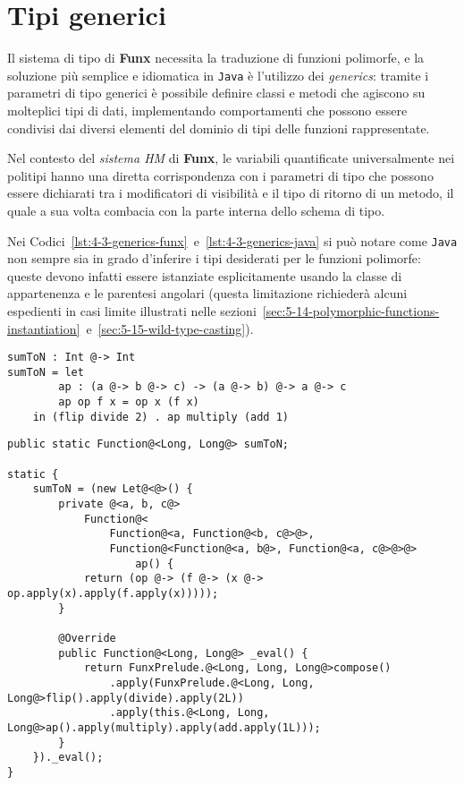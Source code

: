 \section{Tipi generici}
\label{sec:4-3-generics}

Il sistema di tipo di \textbf{Funx} necessita la traduzione di funzioni polimorfe,
e la soluzione più semplice e idiomatica in \texttt{Java} è l'utilizzo dei \textit{generics}:
tramite i parametri di tipo generici è possibile definire classi e metodi che agiscono su molteplici tipi di dati,
implementando comportamenti che possono essere condivisi dai diversi elementi del dominio di tipi delle funzioni rappresentate.


Nel contesto del \textit{sistema HM} di \textbf{Funx}, le variabili quantificate universalmente nei politipi
hanno una diretta corrispondenza con i parametri di tipo che possono essere dichiarati tra i modificatori di visibilità
e il tipo di ritorno di un metodo, il quale a sua volta combacia con la parte interna dello schema di tipo.


Nei Codici~\ref{lst:4-3-generics-funx}~e~\ref{lst:4-3-generics-java} si può notare come \texttt{Java} non sempre sia in grado
d'inferire i tipi desiderati per le funzioni polimorfe: queste devono infatti essere istanziate esplicitamente
usando la classe di appartenenza e le parentesi angolari (questa limitazione richiederà alcuni espedienti in casi limite
illustrati nelle sezioni~\ref{sec:5-14-polymorphic-functions-instantiation}~e~\ref{sec:5-15-wild-type-casting}).

\vspace{4mm}
\begin{lstlisting}[caption={Scrittura e utilizzo di funzioni polimorfe in \textbf{Funx}}, style=funxCode, label={lst:4-3-generics-funx}]
sumToN : Int @-> Int
sumToN = let
        ap : (a @-> b @-> c) -> (a @-> b) @-> a @-> c
        ap op f x = op x (f x)
    in (flip divide 2) . ap multiply (add 1)
\end{lstlisting}
\vspace{4mm}
\begin{lstlisting}[caption={Corrispondenti proprietà e metodi \texttt{Java}}, style=javaCode, label={lst:4-3-generics-java}]
public static Function@<Long, Long@> sumToN;

static {
    sumToN = (new Let@<@>() {
        private @<a, b, c@>
            Function@<
                Function@<a, Function@<b, c@>@>,
                Function@<Function@<a, b@>, Function@<a, c@>@>@>
                    ap() {
            return (op @-> (f @-> (x @-> op.apply(x).apply(f.apply(x)))));
        }

        @Override
        public Function@<Long, Long@> _eval() {
            return FunxPrelude.@<Long, Long, Long@>compose()
                .apply(FunxPrelude.@<Long, Long, Long@>flip().apply(divide).apply(2L))
                .apply(this.@<Long, Long, Long@>ap().apply(multiply).apply(add.apply(1L)));
        }
    })._eval();
}  
\end{lstlisting}
